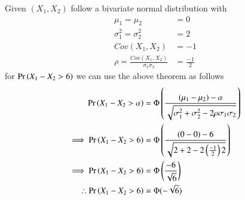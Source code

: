 \documentclass[journal,12pt,twocolumn]{IEEEtran}
\begin{document}
Given $(X_1,X_2)$ follow a bivariate normal distribution with
\begin{align}
    \mu_1=\mu_2&=0\\
    \sigma^2_1=\sigma^2_2&=2\\
    Cov(X_1,X_2)&=-1\\
    \rho=\frac{Cov(X_1,X_2)}{\sigma_1\sigma_2}&=\frac{-1}{2}
\end{align}
for $\Pr\left(X_1-X_2>6\right)$ we can use the above theorem as follows
\begin{align}
    \Pr\left(X_1-X_2>\alpha\right)&=\Phi\left(\frac{(\mu_1-\mu_2)-\alpha}{\sqrt{\sigma^2_1+\sigma^2_2-2\rho\sigma_1\sigma_2}}\right)\\
    \implies \Pr\left(X_1-X_2>6\right)&=\Phi\left(\frac{(0-0)-6}{\sqrt{2+2-2\left(\frac{-1}{2}\right)2}}\right)\\
    \implies \Pr\left(X_1-X_2>6\right)&=\Phi\left(\frac{-6}{\sqrt{6}}\right)\\
    \therefore \Pr\left(X_1-X_2>6\right)&=\Phi(-\sqrt{6})
\end{align}
\end{document}

